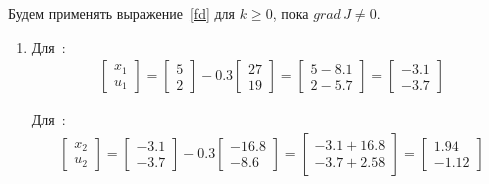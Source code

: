 Будем применять выражение~\eqref{fd} для $k \ge 0$, пока $grad\,J \ne 0$. 

\begin{enumerate}
	\item {}
	
	Для \,:
	\begin{align*}
		\begin{bmatrix}
			x_{1} \\ u_{1}
		\end{bmatrix}
		=
		\begin{bmatrix}
			5 \\ 2
		\end{bmatrix}
		-
		0.3
		\begin{bmatrix}
		27 \\ 19
		\end{bmatrix}
		=
		\begin{bmatrix}
		5 - 8.1 \\ 2 - 5.7
		\end{bmatrix}
		= 
		\begin{bmatrix}
		-3.1 \\ -3.7
		\end{bmatrix}	
	\end{align*}
	
	Для \,:
	\begin{align*}
		\begin{bmatrix}
			x_{2} \\ u_{2}
		\end{bmatrix}
		=
		\begin{bmatrix}
			-3.1 \\ -3.7
		\end{bmatrix}
		-
		0.3
		\begin{bmatrix}
			-16.8 \\ -8.6
		\end{bmatrix}
		=
		\begin{bmatrix}
			-3.1 + 16.8 \\ -3.7 + 2.58
		\end{bmatrix}
		= 
		\begin{bmatrix}
			1.94 \\ -1.12
		\end{bmatrix}	
	\end{align*}


\end{enumerate}
